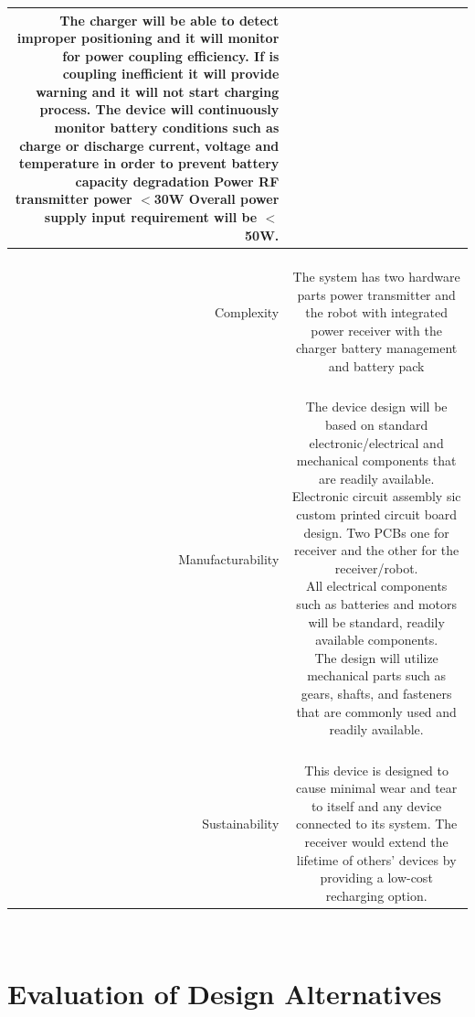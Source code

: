 \documentclass[12pt]{article}
\begin{document}
\begin{table}[h!]
\begin{tabular} {| r | c | }
{ The charger will be able to detect improper positioning and it will monitor for power coupling efficiency. \\
 If is coupling inefficient it will provide warning and it will not start charging process. \\
The device will continuously monitor battery conditions such as charge or discharge current, voltage and temperature in order to prevent battery capacity degradation 
Power\\
RF transmitter power $<$30W  \\
Overall power supply input requirement will be $<$50W.
}\\
\hline
\parbox{0.21\linewidth}{\raggedleft Complexity} &   \parbox{0.772\linewidth}{\hfill \\
The system has two hardware parts power transmitter and the  robot with integrated power receiver with the charger battery management and battery pack 
}\\
\hline
\parbox{0.21\linewidth}{\raggedleft Manufacturability} &   \parbox{0.772\linewidth}{\hfill \\
The device design will be based on standard electronic/electrical and mechanical components that are readily available.\\
Electronic circuit assembly sic custom printed circuit board design. Two PCBs one for receiver and the other for the receiver/robot.\\
All electrical components such as batteries and motors will be standard, readily available components.\\
The design will utilize mechanical parts such as gears, shafts, and fasteners that are commonly used and readily available.
}\\
\hline
\parbox{0.21\linewidth}{\raggedleft Sustainability} &   \parbox{0.772\linewidth}{\hfill \\
This device is designed to cause minimal wear and tear to itself and any device connected to its system.  The receiver would extend the lifetime of others’ devices by providing a low-cost recharging option.
}\\
\hline
\end{tabular}
\end{table}
\hfill 
\pagebreak
\hfill \\

\section{Evaluation of Design Alternatives }	%
\end{document}
